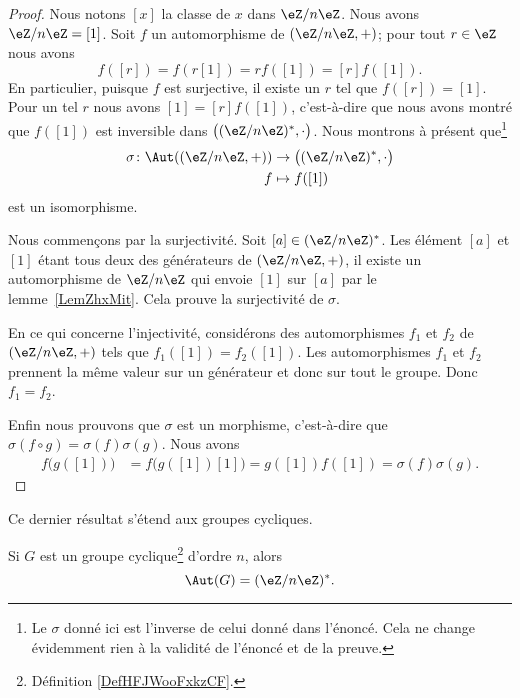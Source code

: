 \begin{proof}
    Nous notons \( [x]\) la classe de \( x\) dans \( \eZ/n\eZ\). Nous avons \( \eZ/n\eZ=[1]\). Soit \( f\) un automorphisme de \( (\eZ/n\eZ,+)\); pour tout \( r\in \eZ\) nous avons
    \begin{equation}
        f([r])=f(r[1])=rf([1])=[r]f([1]).
    \end{equation}
En particulier, puisque \( f\) est surjective, il existe un \( r\) tel que \( f([r])=[1]\). Pour un tel \( r\) nous avons \( [1]=[r]f([1])\), c'est-à-dire que nous avons montré que \( f([1])\) est inversible dans \(  \big( (\eZ/n\eZ)^*,\cdot\big)\). Nous montrons à présent que\footnote{Le \( \sigma\) donné ici est l'inverse de celui donné dans l'énoncé. Cela ne change évidemment rien à la validité de l'énoncé et de la preuve.}
    \begin{equation}
        \begin{aligned}
            \sigma\colon \Aut( (\eZ/n\eZ,+))&\to \big( (\eZ/n\eZ)^*,\cdot \big)\\
            f&\mapsto f([1])
        \end{aligned}
    \end{equation}
    est un isomorphisme.

    Nous commençons par la surjectivité. Soit \( [a]\in (\eZ/n\eZ)^*\). Les élément \( [a]\) et \( [1]\) étant tous deux des générateurs de \( (\eZ/n\eZ,+)\), il existe un automorphisme de \( \eZ/n\eZ\) qui envoie \( [1]\) sur \( [a]\) par le lemme~\ref{LemZhxMit}. Cela prouve la surjectivité de \( \sigma\).

    En ce qui concerne l'injectivité, considérons des automorphismes \( f_1\) et \( f_2\) de \( (\eZ/n\eZ,+)\) tels que \( f_1([1])=f_2([1])\). Les automorphismes \( f_1\) et \( f_2\) prennent la même valeur sur un générateur et donc sur tout le groupe. Donc \( f_1=f_2\).

    Enfin nous prouvons que \( \sigma\) est un morphisme, c'est-à-dire que \( \sigma(f\circ g)=\sigma(f)\sigma(g)\). Nous avons
    \begin{subequations}
        \begin{align}
            f\big( g([1]) \big)&=f\big( g([1])[1] \big)=g([1])f([1])=\sigma(f)\sigma(g).
        \end{align}
    \end{subequations}
\end{proof}

Ce dernier résultat s'étend aux groupes cycliques.
\begin{proposition}     \label{PROPooBZOMooVOHoYf}
    Si \( G\) est un groupe cyclique\footnote{Définition \ref{DefHFJWooFxkzCF}.} d'ordre \( n\), alors
    \begin{equation}
        \Aut(G)=(\eZ/n\eZ)^*.
    \end{equation}
\end{proposition}

